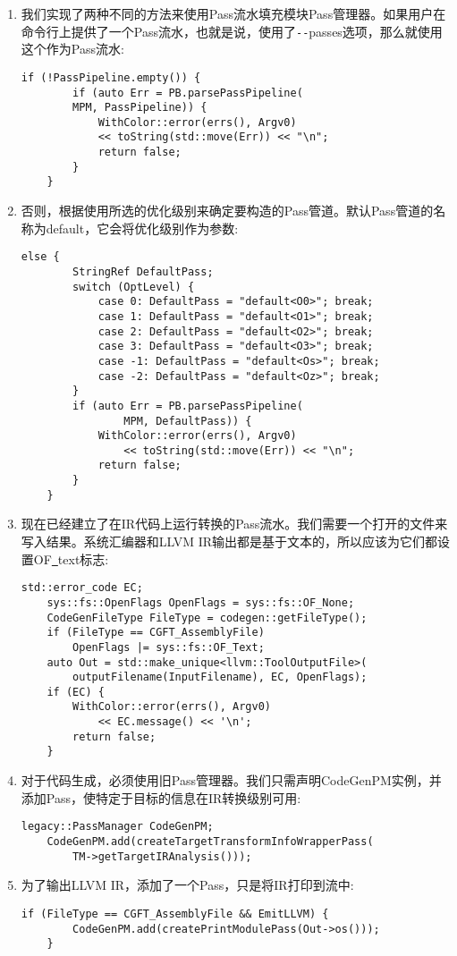 \begin{enumerate}
\item 我们实现了两种不同的方法来使用Pass流水填充模块Pass管理器。如果用户在命令行上提供了一个Pass流水，也就是说，使用了\verb|--|passes选项，那么就使用这个作为Pass流水:
\begin{lstlisting}[caption={}]
	if (!PassPipeline.empty()) {
		if (auto Err = PB.parsePassPipeline(
		MPM, PassPipeline)) {
			WithColor::error(errs(), Argv0)
			<< toString(std::move(Err)) << "\n";
			return false;
		}
	}
\end{lstlisting}

\item 否则，根据使用所选的优化级别来确定要构造的Pass管道。默认Pass管道的名称为default，它会将优化级别作为参数:
\begin{lstlisting}[caption={}]
	else {
		StringRef DefaultPass;
		switch (OptLevel) {
			case 0: DefaultPass = "default<O0>"; break;
			case 1: DefaultPass = "default<O1>"; break;
			case 2: DefaultPass = "default<O2>"; break;
			case 3: DefaultPass = "default<O3>"; break;
			case -1: DefaultPass = "default<Os>"; break;
			case -2: DefaultPass = "default<Oz>"; break;
		}
		if (auto Err = PB.parsePassPipeline(
				MPM, DefaultPass)) {
			WithColor::error(errs(), Argv0)
				<< toString(std::move(Err)) << "\n";
			return false;
		}
	}
\end{lstlisting}

\item 现在已经建立了在IR代码上运行转换的Pass流水。我们需要一个打开的文件来写入结果。系统汇编器和LLVM IR输出都是基于文本的，所以应该为它们都设置OF\underline{~}text标志:
\begin{lstlisting}[caption={}]
	std::error_code EC;
	sys::fs::OpenFlags OpenFlags = sys::fs::OF_None;
	CodeGenFileType FileType = codegen::getFileType();
	if (FileType == CGFT_AssemblyFile)
		OpenFlags |= sys::fs::OF_Text;
	auto Out = std::make_unique<llvm::ToolOutputFile>(
		outputFilename(InputFilename), EC, OpenFlags);
	if (EC) {
		WithColor::error(errs(), Argv0)
			<< EC.message() << '\n';
		return false;
	}
\end{lstlisting}

\item 对于代码生成，必须使用旧Pass管理器。我们只需声明CodeGenPM实例，并添加Pass，使特定于目标的信息在IR转换级别可用:
\begin{lstlisting}[caption={}]
	legacy::PassManager CodeGenPM;
	CodeGenPM.add(createTargetTransformInfoWrapperPass(
		TM->getTargetIRAnalysis()));
\end{lstlisting}

\item 为了输出LLVM IR，添加了一个Pass，只是将IR打印到流中:
\begin{lstlisting}[caption={}]
	if (FileType == CGFT_AssemblyFile && EmitLLVM) {
		CodeGenPM.add(createPrintModulePass(Out->os()));
	}
\end{lstlisting}


\end{enumerate}

